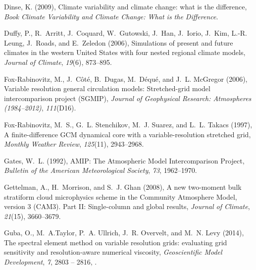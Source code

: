 \documentclass[ms,draft]{agutex}   %
\begin{document}
\begin{article}
\begin{thebibliography}{84}
Dinse, K. (2009), Climate variability and climate change: what is the
  difference, \textit{Book Climate Variability and Climate Change: What is the
  Difference}.

Duffy, P., R.~Arritt, J.~Coquard, W.~Gutowski, J.~Han, J.~Iorio, J.~Kim, L.-R.
  Leung, J.~Roads, and E.~Zeledon (2006), {Simulations of present and future
  climates in the western United States with four nested regional climate
  models}, \textit{Journal of Climate}, \textit{19}(6), 873--895.

Fox-Rabinovitz, M., J.~C{\^o}t{\'e}, B.~Dugas, M.~D{\'e}qu{\'e}, and J.~L.
  McGregor (2006), {Variable resolution general circulation models:
  Stretched-grid model intercomparison project (SGMIP)}, \textit{Journal of
  Geophysical Research: Atmospheres (1984--2012)}, \textit{111}(D16).

Fox-Rabinovitz, M.~S., G.~L. Stenchikov, M.~J. Suarez, and L.~L. Takacs (1997),
  {A finite-difference GCM dynamical core with a variable-resolution stretched
  grid}, \textit{Monthly Weather Review}, \textit{125}(11), 2943--2968.

{Gates}, W.~L. (1992), {AMIP: The Atmospheric Model Intercomparison Project},
  \textit{Bulletin of the American Meteorological Society}, \textit{73},
  1962--1970.

Gettelman, A., H.~Morrison, and S.~J. Ghan (2008), {A new two-moment bulk
  stratiform cloud microphysics scheme in the Community Atmosphere Model,
  version 3 (CAM3). Part II: Single-column and global results}, \textit{Journal
  of Climate}, \textit{21}(15), 3660--3679.

Guba, O., M.~A.Taylor, P.~A. Ullrich, J.~R. Overvelt, and M.~N. Levy (2014),
  The spectral element method on variable resolution grids: evaluating grid
  sensitivity and resolution-aware numerical viscosity, \textit{Geoscientific
  Model Development}, \textit{7}, 2803 -- 2816, .


\end{thebibliography}
\end{article}
\end{document}
